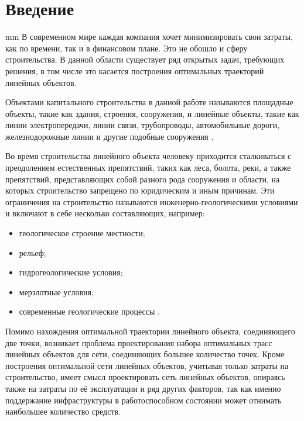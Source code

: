 \newpage
\section*{\LARGE{Введение}}
 mm
В современном мире каждая компания хочет минимизировать свои затраты, как по времени, так и в финансовом плане. Это не обошло и сферу строительства. В данной области существует ряд открытых задач, требующих решения, в том числе это касается построения оптимальных траекторий линейных объектов.
\par
Объектами капитального строительства в данной работе называются площадные объекты, такие как здания, строения, сооружения, и линейные объекты, такие как линии электропередачи, линии связи, трубопроводы, автомобильные дороги, железнодорожные линии и другие подобные сооружения \cite{CapitalBuilding}.
\par
Во время строительства линейного объекта человеку приходится сталкиваться с преодолением естественных препятствий, таких как леса, болота, реки, а также препятствий, представляющих собой разного рода сооружения и области, на которых строительство запрещено по юридическим и иным причинам. Эти ограничения на строительство называются инженерно-геологическими условиями и включают в себе несколько составляющих, например: 
\begin{itemize}
	\item геологическое строение местности;
	\item рельеф;
	\item гидрогеологические условия;
	\item мерзлотные условия;
	\item современные геологические процессы \cite{EngGeoConditions}.
\end{itemize}
\par
Помимо нахождения оптимальной траектории линейного объекта, соединяющего две точки, возникает проблема проектирования набора оптимальных трасс линейных объектов для сети, соединяющих большее количество точек. Кроме построения оптимальной сети линейных объектов, учитывая только затраты на строительство, имеет смысл проектировать сеть линейных объектов, опираясь также на затраты по её эксплуатации и ряд других факторов, так как именно поддержание инфраструктуры в работоспособном состоянии может отнимать наибольшее количество средств.